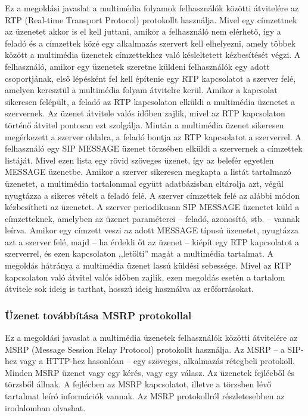 Ez a megoldási javaslat a multimédia folyamok felhasználók közötti átvitelére az RTP (Real-time Transport Protocol) protokollt használja. Mivel egy címzettnek az üzenetet akkor is el kell juttani, amikor a felhasználó nem elérhető, így a feladó és a címzettek közé egy alkalmazás szervert kell elhelyezni, amely többek között a multimédia üzenetek címzettekhez való késleltetett kézbesítését végzi. A felhasználó, amikor egy üzenetek szeretne küldeni felhasználók egy adott csoportjának, első lépésként fel kell építenie egy RTP kapcsolatot a szerver felé, amelyen keresztül a multimédia folyam átvitelre kerül. Amikor a kapcsolat sikeresen felépült, a feladó az RTP kapcsolaton elküldi a multimédia üzenetet a szervernek. Az üzenet átvitele valós időben zajlik, mivel az RTP kapcsolaton történő átvitel pontosan ezt szolgálja. Miután a multimédia üzenet sikeresen megérkezett a szerver oldalra, a feladó bontja az RTP kapcsolatot a szerverrel. A felhasználó egy SIP MESSAGE üzenet törzsében elküldi a szervernek a címzettek listáját. Mivel ezen lista egy rövid szöveges üzenet, így az belefér egyetlen MESSAGE üzenetbe. Amikor a szerver sikeresen megkapta a listát tartalmazó üzenetet, a multimédia tartalommal együtt adatbázisban eltárolja azt, végül nyugtázza a sikeres vételt a feladó felé. A szerver címzettek felé az alábbi módon kézbesítheti az üzenetet. A szerver periodikusan SIP MESSAGE üzenetet küld a címzetteknek, amelyben az üzenet paraméterei -- feladó, azonosító, stb. -- vannak leírva. Amikor egy címzett veszi az adott MESSAGE típusú üzenetet, nyugtázza azt a szerver felé, majd -- ha érdekli őt az üzenet -- kiépít egy RTP kapcsolatot a szerverrel, és ezen kapcsolaton ,,letölti'' magát a multimédia tartalmat. A megoldás hátránya a multimédia üzenet lassú küldési sebessége. Mivel az RTP kapcsolaton való átvitel valós időben zajlik, ezen megoldás esetén a tartalom átvitele sok ideig is tarthat, hosszú ideig használva az erőforrásokat.

\subsubsection{Üzenet továbbítása MSRP protokollal}

Ez a megoldási javaslat a multimédia üzenetek felhasználók közötti átvitelére az MSRP (Message Session Relay Protocol) protokollt használja. Az MSRP -- a SIP-hez vagy a HTTP-hez hasonlóan -- egy szöveges, alkalmazás rétegbeli protokoll. Minden MSRP üzenet vagy egy kérés, vagy egy válasz. Az üzenetek fejlécből és törzsből állnak. A fejlécben az MSRP kapcsolatot, illetve a törzsben lévő tartalmat leíró információk vannak. Az MSRP protokollról részletesebben az~\cite{rfc4975} irodalomban olvashat.

